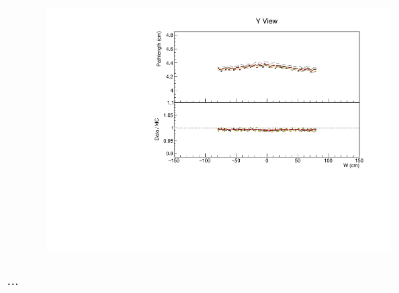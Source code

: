 \documentclass[12pt,a4paper]{article}
\begin{document}
\begin{figure}[h!]
\begin{subfigure}{0.5\textwidth}
  \end{subfigure}
  \begin{subfigure}{0.5\textwidth}
    \includegraphics[width=\linewidth]{essentialsec_tb/cm_w_y.pdf}
  \end{subfigure}
  \caption{...}
  \label{figAbsCalibW2}
\end{figure}
\end{document}
